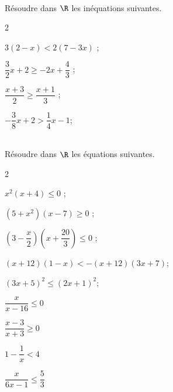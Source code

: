 \documentclass[11pt,a4paper]{article}  %
\begin{document}
\\
Résoudre dans $\R$  les inéquations suivantes.
\begin{multicols}{2}
	\begin{enumMet}
		\item $3(2-x)<2(7-3 x)$ ;
		\item $\dfrac{3}{2} x+2 \geqslant-2 x+\dfrac{4}{3}$ ;
		\item $\dfrac{x+3}{2} \geqslant \dfrac{x+1}{3}$ ;
		\item $-\dfrac{3}{8} x+2>\dfrac{1}{4} x-1$;
	\end{enumMet}
\end{multicols}
\vspace*{-0.3cm}

\\
Résoudre dans $\R$  les équations suivantes.
\begin{multicols}{2}
    \begin{enumMet}
        \item $x^2(x+4) \leqslant 0$ ;
        \item $\left(5+x^2\right)(x-7) \geqslant 0$ ;
        \item $\left(3-\dfrac{x}{2}\right)\left(x+\dfrac{20}{3}\right) \leqslant 0$ ;
        \item $(x+12)(1-x)<-(x+12)(3 x+7)$;
        \item $(3 x+5)^2 \leqslant(2 x+1)^2$;
        \item $\dfrac{x}{x-16} \leqslant 0$
        \item $\dfrac{x-3}{x+3} \geqslant 0$
        \item $1-\dfrac{1}{x}<4$
        \item $\dfrac{x}{6 x-1} \leqslant \dfrac{5}{3}$
    \end{enumMet}
\end{multicols}
\end{document}
